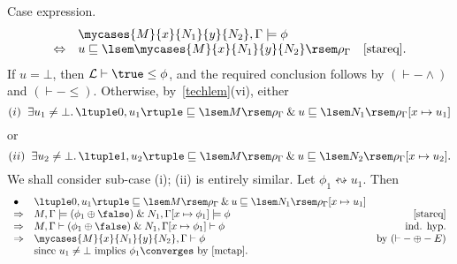Case expression.
\[ \begin{array}{llr}
& \mycases{M}{x}{N_{1}}{y}{N_{2}}, \Gamma \models \phi & \\
\Leftrightarrow & u \sqsubseteq \lsem \mycases{M}{x}{N_{1}}{y}{N_{2}} \rsem \rho_{\Gamma} & \ref{stareq}.
\end{array} \]
If $u = \bot$, then ${\cal L} \vdash \true \leq \phi$, and the required conclusion follows by $({\vdash}-{\wedge})$ and $({\vdash}-{\leq})$.
Otherwise, by~\ref{techlem}(vi), either
\[ (i) \;\; \exists u_{1} \not= \bot . \, \ltuple 0, u_{1} \rtuple \sqsubseteq \lsem M \rsem \rho_{\Gamma} \: \& \: u \sqsubseteq \lsem N_{1} \rsem \rho_{\Gamma} [x \mapsto u_{1}] \]
or
\[ (ii) \;\; \exists u_{2} \not= \bot . \, \ltuple 1, u_{2} \rtuple \sqsubseteq \lsem M \rsem \rho_{\Gamma} \: \& \: u \sqsubseteq \lsem N_{2} \rsem \rho_{\Gamma} [x \mapsto u_{2}]  . \]
We shall consider sub-case (i); (ii) is entirely similar.
Let $\phi_{1} \leftrightsquigarrow u_{1}$. Then
\[ \begin{array}{llr}
\bullet & \ltuple 0, u_{1} \rtuple \sqsubseteq \lsem M \rsem \rho_{\Gamma} \: \& \: u \sqsubseteq \lsem N_{1} \rsem \rho_{\Gamma} [x \mapsto u_{1}]  & \\
\Rightarrow & M, \Gamma \models (\phi_{1} \oplus \false ) \; \& \; N_{1}, \Gamma [x \mapsto \phi_{1}] \models \phi & \ref{stareq} \\
\Rightarrow & M, \Gamma \vdash (\phi_{1} \oplus \false ) \; \& \; N_{1}, \Gamma [x \mapsto \phi_{1}] \vdash \phi & \mbox{ind. hyp.} \\
\Rightarrow & \mycases{M}{x}{N_{1}}{y}{N_{2}}, \Gamma \vdash \phi & 
\mbox{by $({\vdash}-{\oplus}-E)$} \\
& \mbox{since $u_{1} \not= \bot$ implies $\phi_{1} \converges$ by \ref{metap}.} &
\end{array} \]

